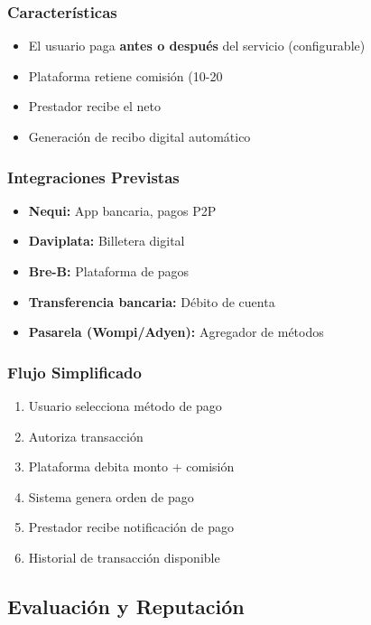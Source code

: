 \documentclass[12pt,a4paper,spanish]{article}
\begin{document}
\subsubsection{Características}

\begin{itemize}
    \item El usuario paga \textbf{antes o después} del servicio (configurable)
    \item Plataforma retiene comisión (10-20%
    \item Prestador recibe el neto
    \item Generación de recibo digital automático
\end{itemize}

\subsubsection{Integraciones Previstas}

\begin{itemize}
    \item \textbf{Nequi:} App bancaria, pagos P2P
    \item \textbf{Daviplata:} Billetera digital
    \item \textbf{Bre-B:} Plataforma de pagos
    \item \textbf{Transferencia bancaria:} Débito de cuenta
    \item \textbf{Pasarela (Wompi/Adyen):} Agregador de métodos
\end{itemize}

\subsubsection{Flujo Simplificado}

\begin{enumerate}
    \item Usuario selecciona método de pago
    \item Autoriza transacción
    \item Plataforma debita monto + comisión
    \item Sistema genera orden de pago
    \item Prestador recibe notificación de pago
    \item Historial de transacción disponible
\end{enumerate}

\subsection{Evaluación y Reputación}
\end{document}
